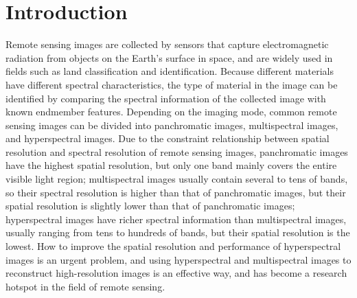\documentclass[journal]{IEEEtran}%
\begin{document}
\section{Introduction}%
\label{sec:Introduction}%
Remote sensing images are collected by sensors that capture electromagnetic radiation from objects on the Earth's surface in space, and are widely used in fields such as land classification and identification. Because different materials have different spectral characteristics, the type of material in the image can be identified by comparing the spectral information of the collected image with known endmember features. Depending on the imaging mode, common remote sensing images can be divided into panchromatic images, multispectral images, and hyperspectral images. Due to the constraint relationship between spatial resolution and spectral resolution of remote sensing images, panchromatic images have the highest spatial resolution, but only one band mainly covers the entire visible light region; multispectral images usually contain several to tens of bands, so their spectral resolution is higher than that of panchromatic images, but their spatial resolution is slightly lower than that of panchromatic images; hyperspectral images have richer spectral information than multispectral images, usually ranging from tens to hundreds of bands, but their spatial resolution is the lowest. How to improve the spatial resolution and performance of hyperspectral images is an urgent problem, and using hyperspectral and multispectral images to reconstruct high{-}resolution images is an effective way, and has become a research hotspot in the field of remote sensing.%
\par%
\end{document}
